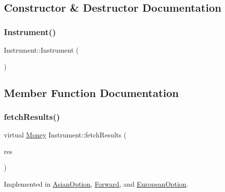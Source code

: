 \subsection{Constructor \& Destructor Documentation}
\hypertarget{class_instrument_a1a297b2cbe1e239c8ede2e90185e2880}{}\label{class_instrument_a1a297b2cbe1e239c8ede2e90185e2880} 
\subsubsection{\texorpdfstring{Instrument()}{Instrument()}}
{\footnotesize\ttfamily Instrument\+::\+Instrument (\begin{DoxyParamCaption}{ }\end{DoxyParamCaption})\hspace{0.3cm}{\ttfamily [inline]}}



\subsection{Member Function Documentation}
\hypertarget{class_instrument_a381f093402f789ad7c0ffecd233167dc}{}\label{class_instrument_a381f093402f789ad7c0ffecd233167dc} 
\subsubsection{\texorpdfstring{fetch\+Results()}{fetchResults()}}
{\footnotesize\ttfamily virtual \hyperlink{_name_def_8h_a5a9d48c16a694e9a2d9f1eca730dc8c5}{Money} Instrument\+::fetch\+Results (\begin{DoxyParamCaption}\item[{\hyperlink{class_pricing_engine_1_1_results}{Pricing\+Engine\+::\+Results} $\ast$const}]{res }\end{DoxyParamCaption})\hspace{0.3cm}{\ttfamily [pure virtual]}}



Implemented in \hyperlink{class_asian_option_a99cd9956b73d99a64748c913dcccd6ea}{Asian\+Option}, \hyperlink{class_forward_ab1e2edeb8345c8605013634a598d1ae5}{Forward}, and \hyperlink{class_european_option_ae234d562ef21dc24c25f1538860da1cf}{European\+Option}.

\hypertarget{class_instrument_aa750f2ae95a21d65a073da3171e8d084}{}\label{class_instrument_aa750f2ae95a21d65a073da3171e8d084} 
